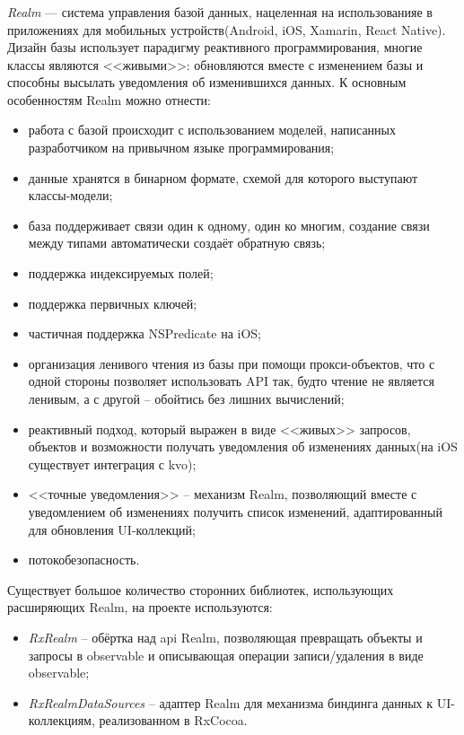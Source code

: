 \subsubsection{}
\label{sec:development:arch:ios:realm}

\emph{Realm} --- система управления базой данных, нацеленная на использованияе в приложениях для мобильных устройств(Android, iOS, Xamarin, React Native). Дизайн базы использует парадигму реактивного программирования, многие классы являются <<живыми>>: обновляются вместе с изменением базы и способны высылать уведомления об изменившихся данных. К основным особенностям Realm можно отнести:

\begin{itemize}
	\item работа с базой происходит с использованием моделей, написанных разработчиком на привычном языке программирования;
	\item данные хранятся в бинарном формате, схемой для которого выступают классы-модели;
	\item база поддерживает связи один к одному, один ко многим, создание связи между типами автоматически создаёт обратную связь;
	\item поддержка индексируемых полей;
	\item поддержка первичных ключей;
	\item частичная поддержка NSPredicate на iOS;
	\item организация ленивого чтения из базы при помощи прокси-объектов, что с одной стороны позволяет использовать API так, будто чтение не является ленивым, а с другой -- обойтись без лишних вычислений;
	\item реактивный подход, который выражен в виде <<живых>> запросов, объектов и возможности получать уведомления об изменениях данных(на iOS существует интеграция с \gls{kvo});
	\item <<точные уведомления>> -- механизм Realm, позволяющий вместе с уведомлением об изменениях получить список изменений, адаптированный для обновления UI-коллекций;
	\item потокобезопасность.
\end{itemize}

Существует большое количество сторонних библиотек, использующих расширяющих Realm, на проекте используются:

\begin{itemize}
	\item \emph{RxRealm} -- обёртка над \gls{api} Realm, позволяющая превращать объекты и запросы в \gls{observable} и описывающая операции записи/удаления в виде \gls{observable};
	\item \emph{RxRealmDataSources} -- адаптер Realm для механизма биндинга данных к UI-коллекциям, реализованном в RxCocoa.
\end{itemize}